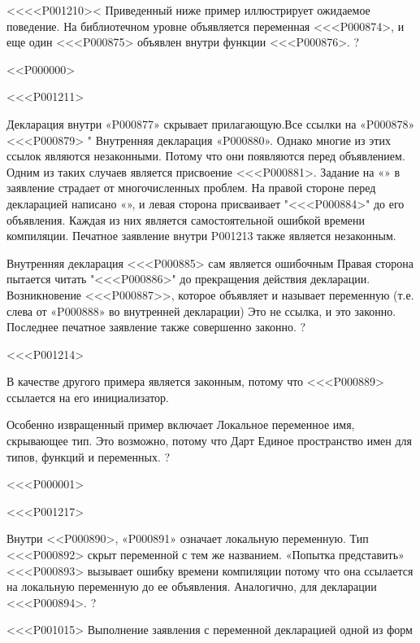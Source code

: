 {{{{{{{{{{{{<<<<P001210><%
Приведенный ниже пример иллюстрирует ожидаемое поведение.
На библиотечном уровне объявляется переменная <<<P000874>,
и еще один <<<P000875> объявлен внутри функции <<<P000876>.%
?

<<P000000>

<<<P001211>{%
Декларация внутри «P000877» скрывает прилагающую.Все ссылки на «P000878» <<<P000879> "
Внутренняя декларация «P000880».
Однако многие из этих ссылок являются незаконными.
Потому что они появляются перед объявлением.
Одним из таких случаев является присвоение <<<P000881>.
Задание на «» в \IF{} заявление
страдает от многочисленных проблем.
На правой стороне перед декларацией написано «»,
и левая сторона присваивает "<<<P000884>" до его объявления.
Каждая из них является самостоятельной ошибкой времени компиляции.
Печатное заявление внутри P001213 также является незаконным.

Внутренняя декларация <<<P000885> сам является ошибочным
Правая сторона пытается
читать "<<<P000886>" до прекращения действия декларации.
Возникновение <<<P000887>>, которое объявляет и называет переменную
(т.е. слева от «P000888» во внутренней декларации)
Это не ссылка, и это законно.
Последнее печатное заявление также совершенно законно.
?

<<<P001214>{%
В качестве другого примера  является законным,
потому что <<<P000889> ссылается на его инициализатор.

Особенно извращенный пример включает
Локальное переменное имя, скрывающее тип.
Это возможно, потому что Дарт
Единое пространство имен для типов, функций и переменных.%
?

<<<P000001>

<<<P001217>{%
Внутри <<P000890>, «P000891» означает локальную переменную.
Тип <<<P000892> скрыт переменной с тем же названием.
«Попытка представить» <<<P000893> вызывает ошибку времени компиляции
потому что она ссылается на локальную переменную до ее объявления.
Аналогично, для декларации <<<P000894>.%
?

<<<P001015>%
Выполнение заявления с переменной декларацией одной из форм
}}}}}}}}}}}}}}}
